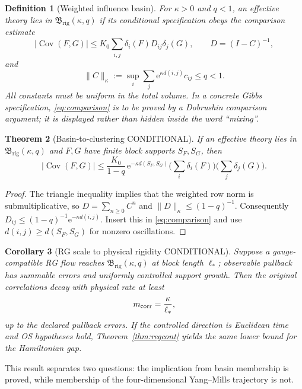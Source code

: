 \documentclass[11pt]{article}
\newcommand{\Cstatus}{\textcolor{conditional}{\textsf{CONDITIONAL}}}
\newcommand{\B}{\mathfrak B_{\mathrm{rig}}}
\newcommand{\Cov}{\operatorname{Cov}}
\newcommand{\e}{\mathrm e}
\newtheorem{definition}{Definition}[section]
\newtheorem{theorem}[definition]{Theorem}
\newtheorem{corollary}[definition]{Corollary}
\theoremstyle{remark}
\begin{document}
\begin{definition}[Weighted influence basin]
For $\kappa>0$ and $q<1$, an effective theory lies in
$\B(\kappa,q)$ if its conditional specification obeys the comparison estimate
\begin{equation}\label{eq:comparison}
 |\Cov(F,G)|
 \le K_0\sum_{i,j}\delta_i(F)D_{ij}\delta_j(G),
 \qquad D=(I-C)^{-1},
\end{equation}
and
\begin{equation}\label{eq:weighted}
 \|C\|_\kappa
 :=\sup_i\sum_j \e^{\kappa d(i,j)}c_{ij}\le q<1.
\end{equation}
All constants must be uniform in the total volume.  In a concrete Gibbs
specification, \eqref{eq:comparison} is to be proved by a Dobrushin comparison
argument; it is displayed rather than hidden inside the word ``mixing''.
\end{definition}

\begin{theorem}[Basin-to-clustering \Cstatus]\label{thm:basin}
If an effective theory lies in $\B(\kappa,q)$ and $F,G$ have finite block
supports $S_F,S_G$, then
\[
 |\Cov(F,G)|
 \le \frac{K_0}{1-q}\,
      \e^{-\kappa d(S_F,S_G)}
      \Big(\sum_i\delta_i(F)\Big)
      \Big(\sum_j\delta_j(G)\Big).
\]
\end{theorem}

\begin{proof}
The triangle inequality implies that the weighted row norm is submultiplicative,
so $D=\sum_{n\ge0}C^n$ and $\|D\|_\kappa\le(1-q)^{-1}$.
Consequently $D_{ij}\le(1-q)^{-1}\e^{-\kappa d(i,j)}$.
Insert this in \eqref{eq:comparison} and use
$d(i,j)\ge d(S_F,S_G)$ for nonzero oscillations.
\end{proof}

\begin{corollary}[RG scale to physical rigidity \Cstatus]
Suppose a gauge-compatible RG flow reaches $\B(\kappa,q)$ at block length
$\ell_*$; observable pullback has summable errors and uniformly controlled
support growth.  Then the original correlations decay with physical rate at
least
\[
 m_{\rm corr}=\frac{\kappa}{\ell_*},
\]
up to the declared pullback errors.  If the controlled direction is Euclidean
time and OS hypotheses hold, Theorem~\ref{thm:regcont} yields the same lower
bound for the Hamiltonian gap.
\end{corollary}

This result separates two questions: the implication from basin membership is
proved, while membership of the four-dimensional Yang--Mills trajectory is not.
\end{document}
